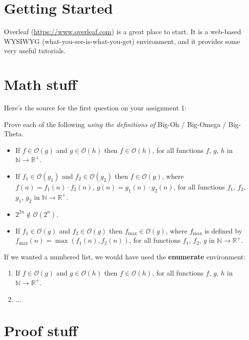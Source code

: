 \documentclass[fleqn]{article}
\newcommand{\nat}{\mathbb{N}}
\newcommand{\realp}{\mathbb{R}^+}
\newcommand{\bigo}[1]{\mathcal{O}(#1)}
\theoremstyle{definition}  %
\begin{document}
\section{Getting Started}

Overleaf (\href{https://www.overleaf.com}{https://www.overleaf.com}) is a great place to start. It is
a web-based WYSIWYG (what-you-see-is-what-you-get) environment, and it provides some very useful
tutorials.

\section{Math stuff}

Here's the source for the first question on your assignment 1: \bigskip

Prove each of the following {\em using the definitions of } Big-Oh / Big-Omega / Big-Theta.

\begin{itemize}
\item If $f \in \bigo{g}$ and $g \in \bigo{h}$ then $f \in \bigo{h}$, for all functions $f$, $g$,
  $h$ in $\nat \to \realp$.

\item If $f_1 \in \bigo{g_1}$ and $f_2 \in \bigo{g_2}$ then $f \in \bigo{g}$, where
  $f(n) = f_1(n) \cdot f_2(n)$, $g(n) = g_1(n) \cdot g_2(n)$, for all functions $f_1$, $f_2$, $g_1$,
  $g_2$ in $\nat \to \realp$.

\item $2^{2n} \not\in \bigo{2^n}$.

\item If $f_1 \in \bigo{g}$ and $f_2 \in \bigo{g}$ then $f_{\max} \in \bigo{g}$, where $f_{\max}$ is
  defined by $f_{\max}(n) = \max(f_1(n), f_2(n))$, for all functions $f_1$, $f_2$, $g$ in
  $\nat \to \realp$.
\end{itemize}

If we wanted a numbered list, we would have used the \textbf{enumerate} environment:

\begin{enumerate}
\item If $f \in \bigo{g}$ and $g \in \bigo{h}$ then $f \in \bigo{h}$, for all functions $f$, $g$, $h$ in $\nat \to \realp$.

\item $\hdots$

\end{enumerate}

\section{Proof stuff}
\end{document}
